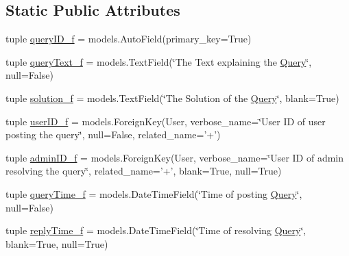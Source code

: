 \subsection*{Static Public Attributes}
\begin{DoxyCompactItemize}
\item 
tuple \hyperlink{class_ecodena_1_1_query_1_1models_1_1_query_ae1ec984785258399cd3757f0c001c449}{queryID\_\-f} = models.AutoField(primary\_\-key=True)
\item 
tuple \hyperlink{class_ecodena_1_1_query_1_1models_1_1_query_a82f008f189f9a40b1bc97147e81ce7ed}{queryText\_\-f} = models.TextField(\char`\"{}The Text explaining the \hyperlink{class_ecodena_1_1_query_1_1models_1_1_query}{Query}\char`\"{}, null=False)
\item 
tuple \hyperlink{class_ecodena_1_1_query_1_1models_1_1_query_aa5784dfc285de57ac58e20358ec86136}{solution\_\-f} = models.TextField(\char`\"{}The Solution of the \hyperlink{class_ecodena_1_1_query_1_1models_1_1_query}{Query}\char`\"{}, blank=True)
\item 
tuple \hyperlink{class_ecodena_1_1_query_1_1models_1_1_query_af6d91b41546f1d338987e4072357700c}{userID\_\-f} = models.ForeignKey(User, verbose\_\-name=\char`\"{}User ID of user posting the query\char`\"{}, null=False, related\_\-name='+')
\item 
tuple \hyperlink{class_ecodena_1_1_query_1_1models_1_1_query_ae756b917504c1bbc04ff9998fe2b6961}{adminID\_\-f} = models.ForeignKey(User, verbose\_\-name=\char`\"{}User ID of admin resolving the query\char`\"{}, related\_\-name='+', blank=True, null=True)
\item 
tuple \hyperlink{class_ecodena_1_1_query_1_1models_1_1_query_a69b4646a1bbc4d7dc831028df2f80bae}{queryTime\_\-f} = models.DateTimeField(\char`\"{}Time of posting \hyperlink{class_ecodena_1_1_query_1_1models_1_1_query}{Query}\char`\"{}, null=False)
\item 
tuple \hyperlink{class_ecodena_1_1_query_1_1models_1_1_query_a45776c99ebfd110c2d178c1223ddb886}{replyTime\_\-f} = models.DateTimeField(\char`\"{}Time of resolving \hyperlink{class_ecodena_1_1_query_1_1models_1_1_query}{Query}\char`\"{}, blank=True, null=True)
\end{DoxyCompactItemize}
